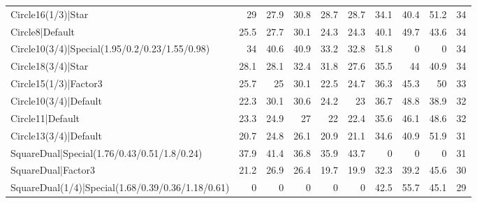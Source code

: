 \begin{tabular}{lrrrrrrrrr}
 Circle16(1/3)|Star                                       &           29   &           27.9 &            30.8 &           28.7 &           28.7 &            34.1 &            40.4 &            51.2 &           34 \\
 Circle8|Default                                          &           25.5 &           27.7 &            30.1 &           24.3 &           24.3 &            40.1 &            49.7 &            43.6 &           34 \\
 Circle10(3/4)|Special(1.95/0.2/0.23/1.55/0.98)           &           34   &           40.6 &            40.9 &           33.2 &           32.8 &            51.8 &             0   &             0   &           34 \\
 Circle18(3/4)|Star                                       &           28.1 &           28.1 &            32.4 &           31.8 &           27.6 &            35.5 &            44   &            40.9 &           34 \\
 Circle15(1/3)|Factor3                                    &           25.7 &           25   &            30.1 &           22.5 &           24.7 &            36.3 &            45.3 &            50   &           33 \\
 Circle10(3/4)|Default                                    &           22.3 &           30.1 &            30.6 &           24.2 &           23   &            36.7 &            48.8 &            38.9 &           32 \\
 Circle11|Default                                         &           23.3 &           24.9 &            27   &           22   &           22.4 &            35.6 &            46.1 &            48.6 &           32 \\
 Circle13(3/4)|Default                                    &           20.7 &           24.8 &            26.1 &           20.9 &           21.1 &            34.6 &            40.9 &            51.9 &           31 \\
 SquareDual|Special(1.76/0.43/0.51/1.8/0.24)              &           37.9 &           41.4 &            36.8 &           35.9 &           43.7 &             0   &             0   &             0   &           31 \\
 SquareDual|Factor3                                       &           21.2 &           26.9 &            26.4 &           19.7 &           19.9 &            32.3 &            39.2 &            45.6 &           30 \\
 SquareDual(1/4)|Special(1.68/0.39/0.36/1.18/0.61)        &            0   &            0   &             0   &            0   &            0   &            42.5 &            55.7 &            45.1 &           29 \\

\end{tabular}
